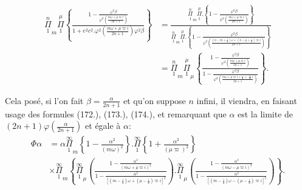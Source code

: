 \documentclass{article}
\begin{document}
\[ \begin{aligned}\overset{n}{\underset{1}{\Pi}}_{m}\overset{\mu}{\underset{1}{\Pi}}\left\{\frac{1-\frac{\varphi^{2}\beta}{\varphi^{2}\left(\frac{m\omega+\mu\varpi i}{2n+1}\right)}}{1+e^{2}c^{2}.\varphi^{2}\left(\frac{m\omega+\mu\varpi i}{2n+1}\right)\varphi^{2}\beta}\right\}&=\frac{\overset{n}{\underset{1}{\Pi}}_{m}\overset{\mu}{\underset{1}{\Pi}}.\left\{1-\frac{\varphi^{2}\beta}{\varphi^{2}\left(\frac{m\omega+\mu\varpi i}{2n+1}\right)}\right\}}{\overset{n}{\underset{1}{\Pi}}_{m}\overset{\mu}{\underset{1}{\Pi}}.\left\{1-\frac{\varphi^{2}\beta}{\varphi^{2}\left(\frac{(n-m+\tfrac{1}{2})\omega+(n-\mu+\tfrac{1}{2})\varpi i}{2n+1}\right)}\right\}}\\ &=\overset{n}{\underset{1}{\Pi}}_{m}\overset{\mu}{\underset{1}{\Pi}}_{\mu}\left\{\frac{1-\frac{\varphi^{2}\beta}{\varphi^{2}\left(\frac{m\omega+\mu\varpi i}{2n+1}\right)}}{1-\frac{\varphi^{2}\beta}{\varphi^{2}\left(\frac{m\omega+\mu\varpi i+\frac{\omega}{2}+\frac{\varpi}{2}i}{2n+1}\right)}}\right\}.\end{aligned} \]

Cela posé, si l'on fait $\beta=\frac{\alpha}{2n+1}$ et qu'on suppose $n$ infini, il viendra, en faisant usage des formules (172.), (173.), (174.), et remarquant que $\alpha$ est la limite de $(2n+1)\varphi\left(\frac{\alpha}{2n+1}\right)$ et égale à $\alpha$:
\[ \begin{aligned}\Phi\alpha&=\alpha\overset{\infty}{\underset{1}{\Pi}}_{m}\left\{1-\frac{\alpha^{2}}{(m\omega)^{2}}\right\}.\overset{\infty}{\underset{1}{\Pi}}\left\{1+\frac{\alpha^{2}}{(\mu\varpi)^{2}}\right\}\\ &\times\overset{\infty}{\underset{1}{\Pi}}_{m}\left\{\overset{\infty}{\underset{1}{\Pi}}_{\mu}\left(\frac{1-\frac{\alpha^{2}}{(m\omega+\mu\varpi i)^{2}}}{1-\frac{\alpha^{2}}{[(m-\tfrac{1}{2})\omega+(\mu-\tfrac{1}{2})\varpi i]^{2}}}\right).\overset{\infty}{\underset{1}{\Pi}}_{\mu}\left(\frac{1-\frac{\alpha^{2}}{(m\omega-\mu\varpi i)^{2}}}{1-\frac{\alpha^{2}}{[(m-\tfrac{1}{2})\omega-(\mu-\tfrac{1}{2})\varpi i]^{2}}}\right)\right\}.\end{aligned} \tag{175.} \]
\end{document}

